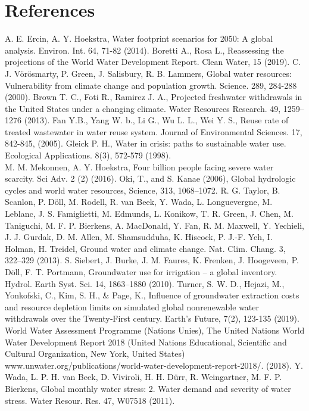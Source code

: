 \documentclass[
  12pt,
]{article}
\begin{document}
\newpage

\hypertarget{references}{%
\section{References}\label{references}}

A. E. Ercin, A. Y. Hoekstra, Water footprint scenarios for 2050: A
global analysis. Environ. Int. 64, 71-82 (2014). Boretti A., Rosa L.,
Reassessing the projections of the World Water Development Report. Clean
Water, 15 (2019). C. J. Vörösmarty, P. Green, J. Salisbury, R. B.
Lammers, Global water resources: Vulnerability from climate change and
population growth. Science. 289, 284-288 (2000). Brown T. C., Foti R.,
Ramirez J. A., Projected freshwater withdrawals in the United States
under a changing climate. Water Resources Research. 49, 1259--1276
(2013). Fan Y.B., Yang W. b., Li G., Wu L. L., Wei Y. S., Reuse rate of
treated wastewater in water reuse system. Journal of Environmental
Sciences. 17, 842-845, (2005). Gleick P. H., Water in crisis: paths to
sustainable water use. Ecological Applications. 8(3), 572-579 (1998).\\
M. M. Mekonnen, A. Y. Hoekstra, Four billion people facing severe water
scarcity. Sci Adv. 2 (2) (2016). Oki, T., and S. Kanae (2006), Global
hydrologic cycles and world water resources, Science, 313, 1068--1072.
R. G. Taylor, B. Scanlon, P. Döll, M. Rodell, R. van Beek, Y. Wada, L.
Longuevergne, M. Leblanc, J. S. Famiglietti, M. Edmunds, L. Konikow, T.
R. Green, J. Chen, M. Taniguchi, M. F. P. Bierkens, A. MacDonald, Y.
Fan, R. M. Maxwell, Y. Yechieli, J. J. Gurdak, D. M. Allen, M.
Shamsudduha, K. Hiscock, P. J.-F. Yeh, I. Holman, H. Treidel, Ground
water and climate change. Nat. Clim. Chang. 3, 322--329 (2013). S.
Siebert, J. Burke, J. M. Faures, K. Frenken, J. Hoogeveen, P. Döll, F.
T. Portmann, Groundwater use for irrigation -- a global inventory.
Hydrol. Earth Syst. Sci. 14, 1863--1880 (2010). Turner, S. W. D.,
Hejazi, M., Yonkofski, C., Kim, S. H., \& Page, K., Influence of
groundwater extraction costs and resource depletion limits on simulated
global nonrenewable water withdrawals over the Twenty‐First century.
Earth's Future, 7(2), 123-135 (2019). World Water Assessment Programme
(Nations Unies), The United Nations World Water Development Report 2018
(United Nations Educational, Scientific and Cultural Organization, New
York, United States)
www.unwater.org/publications/world-water-development-report-2018/.
(2018). Y. Wada, L. P. H. van Beek, D. Viviroli, H. H. Dürr, R.
Weingartner, M. F. P. Bierkens, Global monthly water stress: 2. Water
demand and severity of water stress. Water Resour. Res. 47, W07518
(2011).
\end{document}
